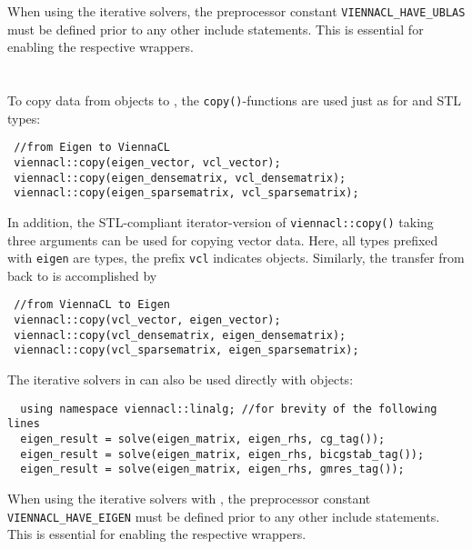 When using the iterative solvers, the preprocessor constant \texttt{VIENNACL\_HAVE\_UBLAS} must be defined prior to any other {\ViennaCL} include statements.
This is essential for enabling the respective wrappers.


\section{\Eigen}
To copy data from {\Eigen} \cite{eigen} objects to {\ViennaCL}, the \texttt{copy()}-functions are used just as for {\ublas} and STL types:
\begin{lstlisting}
 //from Eigen to ViennaCL
 viennacl::copy(eigen_vector, vcl_vector);
 viennacl::copy(eigen_densematrix, vcl_densematrix);
 viennacl::copy(eigen_sparsematrix, vcl_sparsematrix);
\end{lstlisting}
In addition, the STL-compliant iterator-version of \texttt{viennacl::copy()} taking three arguments can be used for copying vector data.
Here, all types prefixed with \texttt{eigen} are {\Eigen} types, the prefix \texttt{vcl} indicates {\ViennaCL} objects.
Similarly, the transfer from {\ViennaCL} back to {\Eigen} is accomplished by
\begin{lstlisting}
 //from ViennaCL to Eigen
 viennacl::copy(vcl_vector, eigen_vector);
 viennacl::copy(vcl_densematrix, eigen_densematrix);
 viennacl::copy(vcl_sparsematrix, eigen_sparsematrix);
\end{lstlisting}

The iterative solvers in {\ViennaCL} can also be used directly with {\Eigen} objects:
\begin{lstlisting}
  using namespace viennacl::linalg; //for brevity of the following lines
  eigen_result = solve(eigen_matrix, eigen_rhs, cg_tag());
  eigen_result = solve(eigen_matrix, eigen_rhs, bicgstab_tag());
  eigen_result = solve(eigen_matrix, eigen_rhs, gmres_tag());
\end{lstlisting}
When using the iterative solvers with {\Eigen}, the preprocessor constant \texttt{VIENNACL\_HAVE\_EIGEN} must be defined prior to any other {\ViennaCL} include statements.
This is essential for enabling the respective wrappers.




